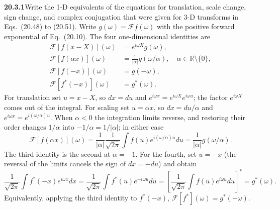 \par\bigskip
\noindent\textbf{20.3.1}\quad Write the 1-D equivalents of the
equations for translation, scale change, sign change, and complex
conjugation that were given for 3-D transforms in Eqs.~(20.48) to
(20.51).
\solution
Write $g(\omega)=\mathcal Ff(\omega)$ with the positive
forward exponential of Eq.~(20.10). The four one-dimensional
identities are
\begin{align*}
\mathcal F[f(x-X)](\omega)&=e^{i\omega X}g(\omega),\\
\mathcal F[f(\alpha x)](\omega)&=\frac1{|\alpha|}g(\omega/\alpha),
\quad \alpha\in\mathbb R\setminus\{0\},\\
\mathcal F[f(-x)](\omega)&=g(-\omega),\\
\mathcal F[f^*(-x)](\omega)&=g^*(\omega).
\end{align*}
For translation set $u=x-X$, so $dx=du$ and
$e^{i\omega x}=e^{i\omega X}e^{i\omega u}$; the factor
$e^{i\omega X}$ comes out of the integral.
For scaling set $u=\alpha x$, so $dx=du/\alpha$ and
$e^{i\omega x}=e^{i(\omega/\alpha)u}$. When $\alpha<0$ the
integration limits reverse, and restoring their order changes
$1/\alpha$ into $-1/\alpha=1/|\alpha|$; in either case
\[
\mathcal F[f(\alpha x)](\omega)
=\frac1{|\alpha|}\frac1{\sqrt{2\pi}}\int f(u)e^{i(\omega/\alpha)u}du
=\frac1{|\alpha|}g(\omega/\alpha).
\]
The third identity is the second at $\alpha=-1$.
For the fourth, set $u=-x$ (the reversal of the limits cancels
the sign of $dx=-du$) and obtain
\[
\frac1{\sqrt{2\pi}}\int f^*(-x)e^{i\omega x}dx
=\frac1{\sqrt{2\pi}}\int f^*(u)e^{-i\omega u}du
=\left[\frac1{\sqrt{2\pi}}\int f(u)e^{i\omega u}du\right]^*
=g^*(\omega).
\]
Equivalently, applying the third identity to $f^*(-x)$,
$\mathcal F[f^*](\omega)=g^*(-\omega)$.


